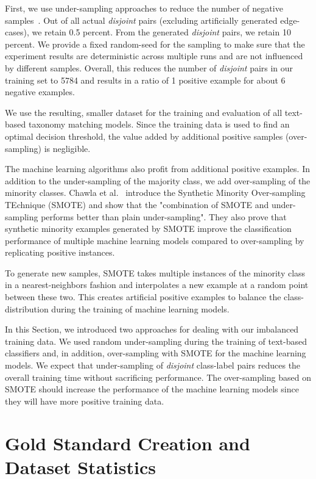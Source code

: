 First, we use under-sampling approaches to reduce the number of negative samples~\cite{chawla2002smote}.
Out of all actual \emph{disjoint} pairs (excluding artificially generated edge-cases), we retain 0.5 percent.
From the generated \emph{disjoint} pairs, we retain 10 percent.
We provide a fixed random-seed for the sampling to make sure that the experiment results are deterministic across
multiple runs and are not influenced by different samples.
Overall, this reduces the number of \emph{disjoint} pairs in our training set to 5784
and results in a ratio of 1 positive example for about 6 negative examples.

We use the resulting, smaller dataset for the training and evaluation of all text-based taxonomy matching models.
Since the training data is used to find an optimal decision threshold, the value added by additional positive samples
(over-sampling) is negligible.

The machine learning algorithms also profit from additional positive examples.
In  addition to the under-sampling of the majority class, we add over-sampling of the minority classes.
Chawla et al.\@~\cite{chawla2002smote} introduce the Synthetic Minority Over-sampling TEchnique (SMOTE) and show
that the "combination of SMOTE and under-sampling performs better than plain under-sampling".
They also prove that synthetic minority examples generated by SMOTE improve the classification performance of multiple
machine learning models compared to over-sampling by replicating positive instances.

To generate new samples, SMOTE takes multiple instances of the minority class in a nearest-neighbors fashion and interpolates
a new example at a random point between these two.
This creates artificial positive examples to balance the class-distribution during the training of machine learning models.

In this Section, we introduced two approaches for dealing with our imbalanced training data.
We used random under-sampling during the training of text-based classifiers and, in addition, over-sampling with
SMOTE for the machine learning models.
We expect that under-sampling of \emph{disjoint} class-label pairs reduces the overall training time without sacrificing
performance.
The over-sampling based on SMOTE should increase the performance of the machine learning models since they will have
more positive training data.

\section{Gold Standard Creation and Dataset Statistics}
\label{sec:goldstandard-statistics}

